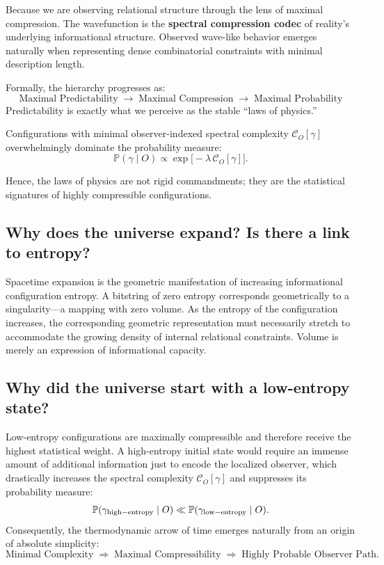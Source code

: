 Because we are observing relational structure through the lens of maximal compression.
The wavefunction is the \textbf{spectral compression codec} of reality's underlying informational structure.
Observed wave-like behavior emerges naturally when representing dense combinatorial constraints with minimal description length.

Formally, the hierarchy progresses as:
\[
\boxed{\text{Maximal Predictability}} \;\rightarrow\; \boxed{\text{Maximal Compression}} \;\rightarrow\; \boxed{\text{Maximal Probability}} 
\]
Predictability is exactly what we perceive as the stable ``laws of physics.''

Configurations with minimal observer-indexed spectral complexity $\mathcal{C}_O[\gamma]$ overwhelmingly dominate the probability measure:
\[
\mathbb{P}(\gamma \mid O) \propto \exp\bigl[-\lambda \, \mathcal{C}_O[\gamma]\bigr].
\]

Hence, the laws of physics are not rigid commandments; they are the statistical signatures of highly compressible configurations.


\subsection*{Why does the universe expand? Is there a link to entropy?}

Spacetime expansion is the geometric manifestation of increasing informational configuration entropy.
A bitstring of zero entropy corresponds geometrically to a singularity—a mapping with zero volume.
As the entropy of the configuration increases, the corresponding geometric representation must necessarily stretch to accommodate the growing density of internal relational constraints.
Volume is merely an expression of informational capacity.


\subsection*{Why did the universe start with a low-entropy state?}

Low-entropy configurations are maximally compressible and therefore receive the highest statistical weight.
A high-entropy initial state would require an immense amount of additional information just to encode the localized observer, which drastically increases the spectral complexity $\mathcal{C}_O[\gamma]$ and suppresses its probability measure:
\[
\mathbb{P}(\gamma_{\rm high-entropy} \mid O) \ll \mathbb{P}(\gamma_{\rm low-entropy} \mid O).
\]
Consequently, the thermodynamic arrow of time emerges naturally from an origin of absolute simplicity:
\[
\text{Minimal Complexity} \;\Rightarrow\; \text{Maximal Compressibility} \;\Rightarrow\; \text{Highly Probable Observer Path}.
\]


